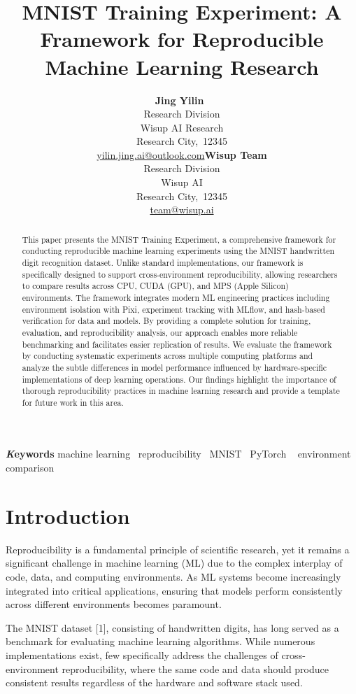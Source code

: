 \documentclass[
]{article}
\title{MNIST Training Experiment: A Framework for Reproducible Machine
Learning Research}
\author{\textbf{Jing Yilin}~\orcidlink{0000-0000-0000-0000}\\Research
Division\\Wisup AI Research\\Research
City,\ 12345\\\href{mailto:yilin.jing.ai@outlook.com}{yilin.jing.ai@outlook.com}\asep\textbf{Wisup
Team}\\Research Division\\Wisup AI\\Research
City,\ 12345\\\href{mailto:team@wisup.ai}{team@wisup.ai}}
\date{}
\begin{document}
\maketitle
\begin{abstract}
This paper presents the MNIST Training Experiment, a comprehensive
framework for conducting reproducible machine learning experiments using
the MNIST handwritten digit recognition dataset. Unlike standard
implementations, our framework is specifically designed to support
cross-environment reproducibility, allowing researchers to compare
results across CPU, CUDA (GPU), and MPS (Apple Silicon) environments.
The framework integrates modern ML engineering practices including
environment isolation with Pixi, experiment tracking with MLflow, and
hash-based verification for data and models. By providing a complete
solution for training, evaluation, and reproducibility analysis, our
approach enables more reliable benchmarking and facilitates easier
replication of results. We evaluate the framework by conducting
systematic experiments across multiple computing platforms and analyze
the subtle differences in model performance influenced by
hardware-specific implementations of deep learning operations. Our
findings highlight the importance of thorough reproducibility practices
in machine learning research and provide a template for future work in
this area.
\end{abstract}
{\bfseries \emph Keywords}
\def\sep{\textbullet\ }
machine learning \sep reproducibility \sep MNIST \sep PyTorch \sep 
environment comparison



\section{Introduction}\label{sec-intro}

Reproducibility is a fundamental principle of scientific research, yet
it remains a significant challenge in machine learning (ML) due to the
complex interplay of code, data, and computing environments. As ML
systems become increasingly integrated into critical applications,
ensuring that models perform consistently across different environments
becomes paramount.

The MNIST dataset {[}1{]}, consisting of handwritten digits, has long
served as a benchmark for evaluating machine learning algorithms. While
numerous implementations exist, few specifically address the challenges
of cross-environment reproducibility, where the same code and data
should produce consistent results regardless of the hardware and
software stack used.
\end{document}
